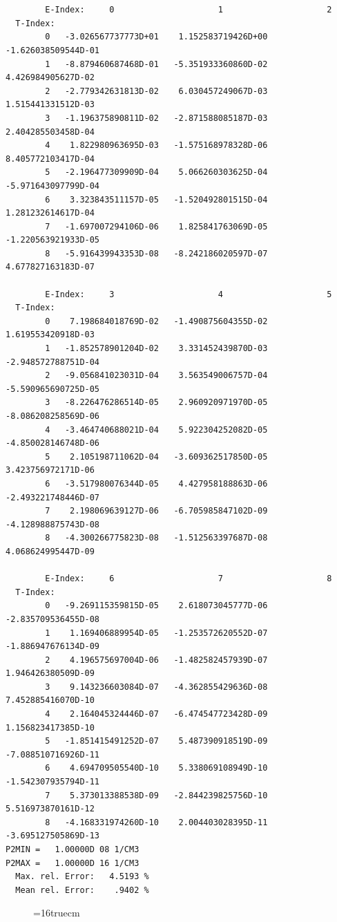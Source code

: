\documentclass[12pt,dvipdfmx]{article}
\begin{document}
\begin{small}\begin{verbatim}


        E-Index:     0                     1                     2
  T-Index:
        0   -3.026567737773D+01    1.152583719426D+00   -1.626038509544D-01
        1   -8.879460687468D-01   -5.351933360860D-02    4.426984905627D-02
        2   -2.779342631813D-02    6.030457249067D-03    1.515441331512D-03
        3   -1.196375890811D-02   -2.871588085187D-03    2.404285503458D-04
        4    1.822980963695D-03   -1.575168978328D-06    8.405772103417D-04
        5   -2.196477309909D-04    5.066260303625D-04   -5.971643097799D-04
        6    3.323843511157D-05   -1.520492801515D-04    1.281232614617D-04
        7   -1.697007294106D-06    1.825841763069D-05   -1.220563921933D-05
        8   -5.916439943353D-08   -8.242186020597D-07    4.677827163183D-07

        E-Index:     3                     4                     5
  T-Index:
        0    7.198684018769D-02   -1.490875604355D-02    1.619553420918D-03
        1   -1.852578901204D-02    3.331452439870D-03   -2.948572788751D-04
        2   -9.056841023031D-04    3.563549006757D-04   -5.590965690725D-05
        3   -8.226476286514D-05    2.960920971970D-05   -8.086208258569D-06
        4   -3.464740688021D-04    5.922304252082D-05   -4.850028146748D-06
        5    2.105198711062D-04   -3.609362517850D-05    3.423756972171D-06
        6   -3.517980076344D-05    4.427958188863D-06   -2.493221748446D-07
        7    2.198069639127D-06   -6.705985847102D-09   -4.128988875743D-08
        8   -4.300266775823D-08   -1.512563397687D-08    4.068624995447D-09

        E-Index:     6                     7                     8
  T-Index:
        0   -9.269115359815D-05    2.618073045777D-06   -2.835709536455D-08
        1    1.169406889954D-05   -1.253572620552D-07   -1.886947676134D-09
        2    4.196575697004D-06   -1.482582457939D-07    1.946426380509D-09
        3    9.143236603084D-07   -4.362855429636D-08    7.452885416070D-10
        4    2.164045324446D-07   -6.474547723428D-09    1.156823417385D-10
        5   -1.851415491252D-07    5.487390918519D-09   -7.088510716926D-11
        6    4.694709505540D-10    5.338069108949D-10   -1.542307935794D-11
        7    5.373013388538D-09   -2.844239825756D-10    5.516973870161D-12
        8   -4.168331974260D-10    2.004403028395D-11   -3.695127505869D-13
P2MIN =   1.00000D 08 1/CM3
P2MAX =   1.00000D 16 1/CM3
  Max. rel. Error:   4.5193 %
  Mean rel. Error:    .9402 %

\end{verbatim}\end{small}
\begin{figure} \label{2.1.8ra}
\epsfxsize=16truecm
\end{figure}
\newpage
\end{document}
